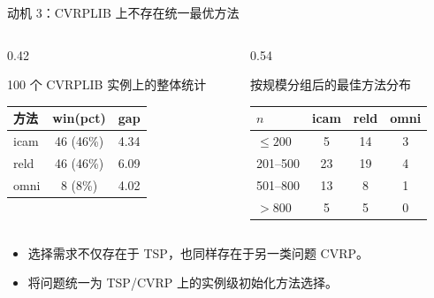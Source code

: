 \documentclass{ctexbeamer}
\begin{document}
\begin{frame}{动机 3：CVRPLIB 上不存在统一最优方法}
  \scriptsize
  \begin{columns}[T]
    \begin{column}{0.42\textwidth}
      \begin{block}{100 个 CVRPLIB 实例上的整体统计}
        \begin{tabular}{lcc}
          \hline
          方法 & win(pct) & gap \\
          \hline
          icam & 46 (46\%) & 4.34 \\
          reld & 46 (46\%) & 6.09 \\
          omni & 8 (8\%)   & 4.02 \\
          \hline
        \end{tabular}
      \end{block}
    \end{column}
    \begin{column}{0.54\textwidth}
      \begin{block}{按规模分组后的最佳方法分布}
        \begin{tabular}{lccc}
          \hline
          $n$ & icam & reld & omni \\
          \hline
          $\leq 200$ & 5 & 14 & 3 \\
          201--500 & 23 & 19 & 4 \\
          501--800 & 13 & 8 & 1 \\
          $> 800$ & 5 & 5 & 0 \\
          \hline
        \end{tabular}
      \end{block}
    \end{column}
  \end{columns}

  \vspace{0.4em}
  \begin{itemize}
    \item 选择需求不仅存在于 TSP，也同样存在于另一类问题 CVRP。
    \item 将问题统一为 TSP/CVRP 上的实例级初始化方法选择。
  \end{itemize}
\end{frame}
\end{document}
